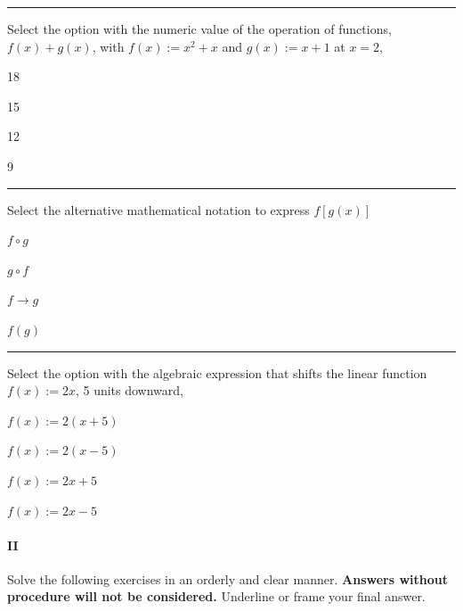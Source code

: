 \begin{preguntas}
\pregunta[5] \rule{1cm}{0.1mm} Select the option with the numeric value of the operation of functions, $f(x) + g(x)$, with $f(x):= x^2 + x$ and $g(x):=x+1$ at $x=2$,

\begin{enumerate*}[label=(\alph*)]
    \item 18 $\qquad$
    \item 15 $\qquad$
    \item 12 $\qquad$
    \item 9 $\qquad$
\end{enumerate*}

\pregunta[5] \rule{1cm}{0.1mm} Select the alternative mathematical notation to express $f[g(x)]$

\begin{enumerate*}[label=(\alph*)]
    \item $f\circ g\qquad$
    \item $g\circ f\qquad$
    \item $f\to g\qquad$
    \item $f(g)\qquad$
\end{enumerate*}

\pregunta[5] \rule{1cm}{0.1mm} Select the option with the algebraic expression that shifts the linear function $f(x):=2x$, 5 units downward,

\begin{enumerate*}[label=(\alph*)]
    \item $f(x):=2(x+5)\qquad$
    \item $f(x):=2(x-5)\qquad$
    \item $f(x):=2x+5\qquad$
    \item $f(x):=2x-5\qquad$
\end{enumerate*}


\end{preguntas}

\newpage

\paragraph{II} Solve the following exercises in an orderly and clear manner. 
\textbf{Answers without procedure will not be considered.}
Underline or frame your final answer.

